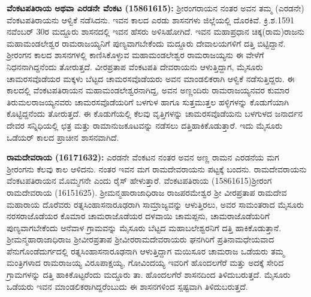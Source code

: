 \textbf{ವೆಂಕಟಪತಿರಾಯ ಅಥವಾ ಎರಡನೇ ವೆಂಕಟ (1586\general{\enginline{-}}1615): } ಶ‍್ರೀರಂಗರಾಯನ ನಂತರ ಅವನ ತಮ್ಮ (ಎರಡನೇ) ವೆಂಕಟಪತಿರಾಯನು ಆಳ್ವಿಕೆ ನಡೆಸಿದನು. ಇವನ ಕಾಲದ ಎರಡು ಶಾಸನಗಳು ಜಿಲ್ಲೆಯಲ್ಲಿ ದೊರಕಿವೆ. ಕ್ರಿ.ಶ.1591 ನವೆಂಬರ್​ 30ರ ಮದ್ದೂರು ಶಾಸನದಲ್ಲಿ ಇವನ ಹೆಸರು ಅಳಿಸಿಹೋಗಿದೆ. ಇವನ ಮಹಾಪ್ರಧಾನ ಚಿಕ್ಕ(ರಾಮ)ರಾಜನು ಮಹಾಮಂಡಲೇಶ್ವರ ರಾಮರಾಜಯ್ಯನಿಗೆ ಪುಣ್ಯವಾಗಬೇಕೆಂದು ಮದ್ದೂರು ದೇವಾಲಯಗಳಿಗೆ ದತ್ತಿ ಬಿಟ್ಟಿದ್ದಾನೆ. ಶ‍್ರೀರಂಗನ ಕಾಲದ ಶಾಸನಗಳಲ್ಲಿ ಕಾಣಿಸಿಕೊಳ್ಳುವ ಮಹಾಮಂಡಲೇಶ್ವರ ರಾಮರಾಜಯ್ಯನು ಈ ವೇಳೆಗೆ ನಿಧನನಾಗಿದ್ದನೆಂದು ತೋರುತ್ತದೆ. ವೀರಪ್ರತಾಪ ವೆಂಕಟಪತಿ ದೇವರಾಯನು ಆಳುತ್ತಿದ್ದಾಗ, ಮೈಸೂರು ಚಾಮರಸವೊಡೆಯರ ಮಕ್ಕಳು ಬೆಟ್ಟದ ಚಾಮರಸ\-ವೊಡೆಯರು ಅವನ ಮಾಂಡಲಿಕರಾಗಿ ಆಳ್ವಿಕೆ ನಡೆಸುತ್ತಿದ್ದರು. ಈ ಕಾಲದಲ್ಲಿ ವೆಂಕಟಪತಿರಾಯನ ಮಹಾಮಂಡಲೇಶ್ವರನಾಗಿದ್ದ, ಅವನ ಅಣ್ಣಂದಿರು ರಾಮರಾಜಯ್ಯನವರ ಕುಮಾರ ತಿರುಮಲರಾಜಯ್ಯನವರು ಚಾಮರಸವೊಡೆಯರಿಗೆ ಬಳಗುಳ ಹಾಗೂ ಸುತ್ತಮುತ್ತಲ ಹಳ್ಳಿಗಳನ್ನು ಕೊಡುಗೆಯಾಗಿ ಕೊಟ್ಟಿದ್ದನೆಂದು ತೋರುತ್ತದೆ. ಈ ಕೊಡುಗೆಯಲ್ಲಿ ಕೆಲವು ವೃತ್ತಿಗಳನ್ನು ಚಾಮರಸ\-ವೊಡೆಯನು ಬಳಗುಳದ ಜನಾರ್ದನ ದೇವರ ಸನ್ನಿಧಿಯಲ್ಲಿ ಛತ್ರ ಮತ್ತು ರಾಮಾನುಜಕೂಟವನ್ನು ನಡೆಸಲು ದತ್ತಿ\break ಹಾಕಿಕೊಡುತ್ತಾರೆ. ಇದು ಮೈಸೂರು ಒಡೆಯರ್ ಕಾಲದ ಪ್ರಾಚೀನ ಶಾಸನವಾಗಿದೆ.

\textbf{ರಾಮದೇವರಾಯ (1617\general{\enginline{-}}1632): } ಎರಡನೇ ವೆಂಕಟನ ನಂತರ ಅವನ ಅಣ್ಣ ರಾಮನ ಎರಡನೆಯ ಮಗ ಶ‍್ರೀರಂಗನು ಕೆಲವು ಕಾಲ ಆಳಿದನು. ನಂತರ ಇವನ ಮಗ ರಾಮದೇವರಾಯನು ಪಟ್ಟಕ್ಕೆ ಬಂದನು. ರಾಮದೇವರಾಯನು ವೆಂಕಟಪತಿರಾಯನ ಮೊಮ್ಮಗನೇ ಎಂದು ರೈಸ್​ ಹೇಳುತ್ತಾರೆ. ವೆಂಕಟಪತಿರಾಯ\enginline{-} (1586\enginline{-}1615)\enginline{-}ಶ‍್ರೀರಂಗ\enginline{-} ರಾಮದೇವರಾಯ (1615\enginline{-}1625). ಶ‍್ರೀಮನ್ಮಹಾರಾಜಾಧಿರಾಜ ರಾಜಪರಮೇಶ್ವರ ಶ‍್ರೀ ವೀರಪ್ರತಾಪ ರಾಮದೇವ ಮಹಾರಾಯ ದೊರೆವರು ರತ್ನಸಿಂಹಾಸನಾರೂಢರಾಗಿ ಸಾಮ್ರಾಜ್ಯವನ್ನು ಆಳುತ್ತಿರಲು, ಅವರ ಸಾಮಂತರಾದ ಮೈಸೂರು ನರಸರಾಜೊಡೆಯರ ಕೊಮಾರ ಚಾಮರಾಜೊಡೆಯರ ದಳವಾಯಿ ಚಾಮಪ್ಪನು, ಚಾಮರಾಜೊಡೆಯರಿಗೆ ಪುಣ್ಯವಾಗಬೇಕೆಂದು ಆನೆವಾಳ ಗ್ರಾಮ\-ವನ್ನು ಮೈಸೂರು ಬೆಟ್ಟದ ಮಹಾಬಲೇಶ್ವರನಿಗೆ ದತ್ತಿ ಹಾಕಿಕೊಡುತ್ತಾನೆ. ಶ‍್ರೀಮನ್ಮಹಾ\-ರಾಜಾಧಿರಾಜ ಶ‍್ರೀವೀರಪ್ರತಾಪ ಶ‍್ರೀವೀರರಾಮದೇವರಾಯರು ಘನಗಿರಿಗೆ ಪ್ರತಿನಾಮಧೇಯವಾದ ಪೆನುಗೊಂಡೆದುರ್ಗದಲ್ಲಿ ರತ್ನಸಿಂಹಾಸನಾರೂಢನಾಗಿ ಆಳುತ್ತಿದ್ದಾಗ ಮಯಿಸೂರ ಚಾಮರಾಜ ಒಡೆಯರು ತಮ್ಮ ಮಂತ್ರಿಗಳಾದ ರಾಮರಾಜಯ್ಯ ವಿರೂಪಾಕ್ಷಯ್ಯ, ಗೋವಿಂದಯ್ಯ ಇವರಿಗೆ ಹೊಂದಲಗೆರೆ ಮತ್ತು ಅದಕ್ಕೆ ಸೇರಿದ ಗ್ರಾಮಗಳನ್ನು ದತ್ತಿ ಹಾಕಿಕೊಟ್ಟರೆಂದು ಮದ್ದೂರು ತಾ. ಹೊಂದಲಗೆರೆ ಶಾಸನದಿಂದ ತಿಳಿದುಬರುತ್ತದೆ. ಮೈಸೂರು ಒಡೆಯರು ಇವನ ಮಾಂಡಲಿಕರಾಗಿದ್ದರೆಂಬುದು ಈ ಶಾಸನಗಳಿಂದ ಸ್ಪಷ್ಟವಾಗಿ ತಿಳಿದುಬರುತ್ತದೆ.

